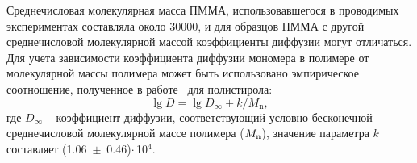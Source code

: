 Среднечисловая молекулярная масса ПММА, использовавшегося в проводимых экспериментах составляла около 30000, и для образцов ПММА с другой среднечисловой молекулярной массой коэффициенты диффузии могут отличаться. Для учета зависимости коэффициента диффузии мономера в полимере от молекулярной массы полимера может быть использовано эмпирическое соотношение, полученное в работе~\cite{Berens_diffusion_Mn} для полистирола:
\begin{equation} \label{eq:diffusion_Mn}
	\lg D = \lg D_\infty + k / M_\mathrm{n},
\end{equation}
где $D_\infty$ -- коэффициент диффузии, соответствующий условно бесконечной среднечисловой молекулярной массе полимера ($M_\mathrm{n}$), значение параметра $k$ составляет (1.06~$\pm$~0.46)\:$\cdot$\,10$^\text{4}$.
